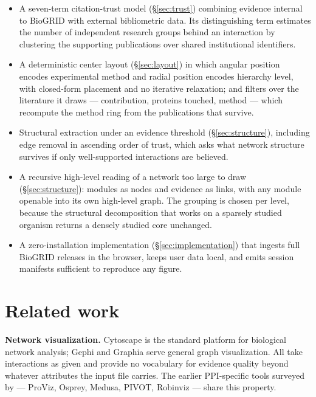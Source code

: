 \documentclass[conference]{IEEEtran}
\begin{document}
\begin{itemize}
  \item A seven-term citation-trust model (\S\ref{sec:trust}) combining evidence
        internal to BioGRID with external bibliometric data. Its distinguishing term
        estimates the number of independent research groups behind an interaction by
        clustering the supporting publications over shared institutional identifiers.
  \item A deterministic center layout (\S\ref{sec:layout}) in which angular position
        encodes experimental method and radial position encodes hierarchy level, with
        closed-form placement and no iterative relaxation; and filters over the
        literature it draws --- contribution, proteins touched, method --- which
        recompute the method ring from the publications that survive.
  \item Structural extraction under an evidence threshold (\S\ref{sec:structure}),
        including edge removal in ascending order of trust, which asks what network
        structure survives if only well-supported interactions are believed.
  \item A recursive high-level reading of a network too large to draw
        (\S\ref{sec:structure}): modules as nodes and evidence as links, with any
        module openable into its own high-level graph. The grouping is chosen per
        level, because the structural decomposition that works on a sparsely studied
        organism returns a densely studied core unchanged.
  \item A zero-installation implementation (\S\ref{sec:implementation}) that ingests
        full BioGRID releases in the browser, keeps user data local, and emits session
        manifests sufficient to reproduce any figure.
\end{itemize}

\section{Related work}

\textbf{Network visualization.} Cytoscape \cite{cytoscape} is the standard platform for
biological network analysis; Gephi and Graphia serve general graph visualization. All
take interactions as given and provide no vocabulary for evidence quality beyond
whatever attributes the input file carries. The earlier PPI-specific tools surveyed by
\cite{prolivis1} --- ProViz, Osprey, Medusa, PIVOT, Robinviz --- share this property.
\end{document}
